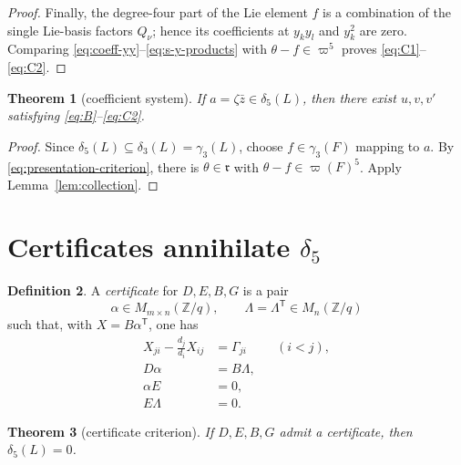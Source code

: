 \documentclass[11pt]{amsart}
\newtheorem{theorem}{Theorem}[section]
\theoremstyle{definition}
\newtheorem{definition}[theorem]{Definition}
\theoremstyle{remark}
\newcommand{\Z}{\mathbb Z}
\newcommand{\gam}{\gamma}
\newcommand{\del}{\delta}
\newcommand{\ww}{\varpi}
\begin{document}
\begin{proof}
Finally, the degree-four part of the Lie element \(f\) is a
combination of the single Lie-basis factors \(Q_\nu\); hence its
coefficients at \(y_ky_l\) and \(y_k^2\) are zero.  Comparing
\eqref{eq:coeff-yy}--\eqref{eq:s-y-products} with
\(\theta-f\in\ww^5\) proves
\eqref{eq:C1}--\eqref{eq:C2}.
\end{proof}

\begin{theorem}[coefficient system]\label{thm:system}
If \(a=\zeta\bar z\in\del_5(L)\), then there exist \(u,v,v'\)
satisfying \eqref{eq:B}--\eqref{eq:C2}.
\end{theorem}

\begin{proof}
Since \(\del_5(L)\subseteq\del_3(L)=\gam_3(L)\), choose
\(f\in\gam_3(F)\) mapping to \(a\).  By
\eqref{eq:presentation-criterion}, there is
\(\theta\in\mathfrak r\) with \(\theta-f\in\ww(F)^5\).
Apply Lemma~\ref{lem:collection}.
\end{proof}

\section{Certificates annihilate
\texorpdfstring{\(\del_5\)}{delta 5}}

\begin{definition}\label{def:certificate}
A \emph{certificate} for \(D,E,B,G\) is a pair
\[
 \alpha\in M_{m\times n}(\Z/q),\qquad
 \Lambda=\Lambda^{\mathsf T}\in M_n(\Z/q)
\]
such that, with \(X=B\alpha^{\mathsf T}\), one has
\begin{align}
 X_{ji}-\frac{d_j}{d_i}X_{ij}&=\Gamma_{ji}
                                   &&(i<j), \tag{P1}\label{eq:P1}\\
 D\alpha&=B\Lambda,                 &&       \tag{P2}\label{eq:P2}\\
 \alpha E&=0,                       &&       \tag{P3}\label{eq:P3}\\
 E\Lambda&=0.                       &&       \tag{P4}\label{eq:P4}
\end{align}
\end{definition}

\begin{theorem}[certificate criterion]\label{thm:criterion}
If \(D,E,B,G\) admit a certificate, then \(\del_5(L)=0\).
\end{theorem}
\end{document}

